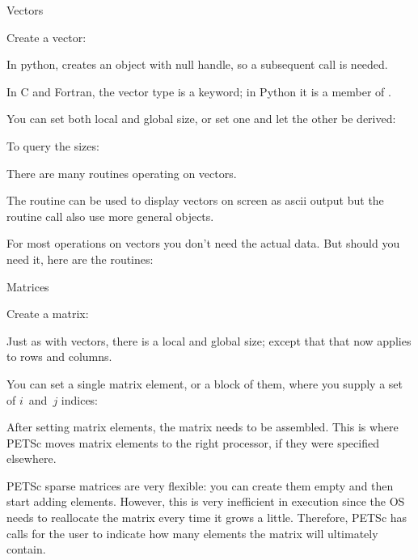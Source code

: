
 {Vectors}

Create a vector:
%

\begin{pythonnote}
  In python,  creates an object with null handle, so a
  subsequent  call is needed.
\end{pythonnote}

In C and Fortran, the vector type is a keyword; in Python it is a
member of .

You can set both local and global size, or set one and let the other
be derived:
%

To query the sizes:
%

There are many routines operating on vectors.
%

The  routine can be used to display vectors on screen as
ascii output
%
%
but the routine call also use more general  objects.

For most operations on vectors you don't need the actual data. But
should you need it, here are the routines:
%

 {Matrices}

Create a matrix:
%

Just as with vectors, there is a local and global size; except that
that now applies to rows and columns.
%
%

You can set a single matrix element, or a block of them, where you
supply a set of $i$~and~$j$ indices:
%

After setting matrix elements, the matrix needs to be assembled. This
is where PETSc moves matrix elements to the right processor, if they
were specified elsewhere.
%

PETSc sparse matrices are very flexible: you can create them empty and
then start adding elements. However, this is very inefficient in
execution since the \ac{OS} needs to reallocate the matrix every time
it grows a little. Therefore, PETSc has calls for the user to indicate
how many elements the matrix will ultimately contain.
%

